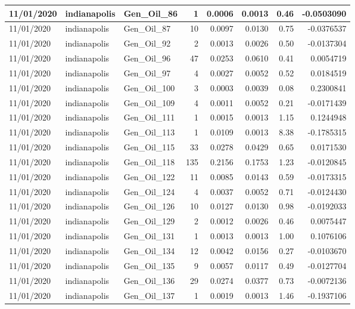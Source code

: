\documentclass[
  letterpaper,
  DIV=11,
  numbers=noendperiod]{scrartcl}
\begin{document}
\begin{tabular}{l|l|l|r|r|r|r|r}
\hline
11/01/2020 & indianapolis & Gen\_Oil\_86 & 1 & 0.0006 & 0.0013 & 0.46 & -0.0503090\\
\hline
11/01/2020 & indianapolis & Gen\_Oil\_87 & 10 & 0.0097 & 0.0130 & 0.75 & -0.0376537\\
\hline
11/01/2020 & indianapolis & Gen\_Oil\_92 & 2 & 0.0013 & 0.0026 & 0.50 & -0.0137304\\
\hline
11/01/2020 & indianapolis & Gen\_Oil\_96 & 47 & 0.0253 & 0.0610 & 0.41 & 0.0054719\\
\hline
11/01/2020 & indianapolis & Gen\_Oil\_97 & 4 & 0.0027 & 0.0052 & 0.52 & 0.0184519\\
\hline
11/01/2020 & indianapolis & Gen\_Oil\_100 & 3 & 0.0003 & 0.0039 & 0.08 & 0.2300841\\
\hline
11/01/2020 & indianapolis & Gen\_Oil\_109 & 4 & 0.0011 & 0.0052 & 0.21 & -0.0171439\\
\hline
11/01/2020 & indianapolis & Gen\_Oil\_111 & 1 & 0.0015 & 0.0013 & 1.15 & 0.1244948\\
\hline
11/01/2020 & indianapolis & Gen\_Oil\_113 & 1 & 0.0109 & 0.0013 & 8.38 & -0.1785315\\
\hline
11/01/2020 & indianapolis & Gen\_Oil\_115 & 33 & 0.0278 & 0.0429 & 0.65 & 0.0171530\\
\hline
11/01/2020 & indianapolis & Gen\_Oil\_118 & 135 & 0.2156 & 0.1753 & 1.23 & -0.0120845\\
\hline
11/01/2020 & indianapolis & Gen\_Oil\_122 & 11 & 0.0085 & 0.0143 & 0.59 & -0.0173315\\
\hline
11/01/2020 & indianapolis & Gen\_Oil\_124 & 4 & 0.0037 & 0.0052 & 0.71 & -0.0124430\\
\hline
11/01/2020 & indianapolis & Gen\_Oil\_126 & 10 & 0.0127 & 0.0130 & 0.98 & -0.0192033\\
\hline
11/01/2020 & indianapolis & Gen\_Oil\_129 & 2 & 0.0012 & 0.0026 & 0.46 & 0.0075447\\
\hline
11/01/2020 & indianapolis & Gen\_Oil\_131 & 1 & 0.0013 & 0.0013 & 1.00 & 0.1076106\\
\hline
11/01/2020 & indianapolis & Gen\_Oil\_134 & 12 & 0.0042 & 0.0156 & 0.27 & -0.0103670\\
\hline
11/01/2020 & indianapolis & Gen\_Oil\_135 & 9 & 0.0057 & 0.0117 & 0.49 & -0.0127704\\
\hline
11/01/2020 & indianapolis & Gen\_Oil\_136 & 29 & 0.0274 & 0.0377 & 0.73 & -0.0072136\\
\hline
11/01/2020 & indianapolis & Gen\_Oil\_137 & 1 & 0.0019 & 0.0013 & 1.46 & -0.1937106\\

\end{tabular}
\end{document}
